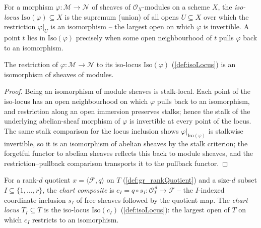 \begin{definition}
  \label{def:isoLocus}
  For a morphism \(\varphi : \mathcal{M} \to \mathcal{N}\) of sheaves of
  \(\mathcal{O}_X\)-modules on a scheme \(X\), the \emph{iso-locus}
  \(\mathrm{Iso}(\varphi) \subseteq X\) is the supremum (union) of all opens
  \(U \subseteq X\) over which the restriction \(\varphi|_U\) is an isomorphism -- the largest
  open on which \(\varphi\) is invertible. A point \(t\) lies in \(\mathrm{Iso}(\varphi)\)
  precisely when some open neighbourhood of \(t\) pulls \(\varphi\) back to an isomorphism.
\end{definition}

\begin{lemma}
  \label{lem:isIso_pullback_isoLocus_map}
  The restriction of \(\varphi : \mathcal{M} \to \mathcal{N}\) to its iso-locus
  \(\mathrm{Iso}(\varphi)\) (\cref{def:isoLocus}) is an isomorphism of sheaves of modules.
\end{lemma}
\begin{proof}
  \leanok
  Being an isomorphism of module sheaves is stalk-local. Each point of the iso-locus has an
  open neighbourhood on which \(\varphi\) pulls back to an isomorphism, and restriction along
  an open immersion preserves stalks; hence the stalk of the underlying abelian-sheaf morphism
  of \(\varphi\) is invertible at every point of the locus. The same stalk comparison for the
  locus inclusion shows \(\varphi|_{\mathrm{Iso}(\varphi)}\) is stalkwise invertible, so it is
  an isomorphism of abelian sheaves by the stalk criterion; the forgetful functor to abelian
  sheaves reflects this back to module sheaves, and the restriction--pullback comparison
  transports it to the pullback functor.
\end{proof}

\begin{definition}
  \label{def:chartLocus}
  For a rank-\(d\) quotient \(x = \langle \mathcal{F}, q\rangle\) on \(T\)
  (\cref{def:gr_rankQuotient}) and a size-\(d\) subset \(I \subseteq \{1,\dots,r\}\), the
  \emph{chart composite} is \(c_I = q \circ s_I : \mathcal{O}_T^{\,d} \to \mathcal{F}\) -- the
  \(I\)-indexed coordinate inclusion \(s_I\) of free sheaves followed by the quotient map. The
  \emph{chart locus} \(T_I \subseteq T\) is the iso-locus \(\mathrm{Iso}(c_I)\)
  (\cref{def:isoLocus}): the largest open of \(T\) on which \(c_I\) restricts to an
  isomorphism.
\end{definition}

